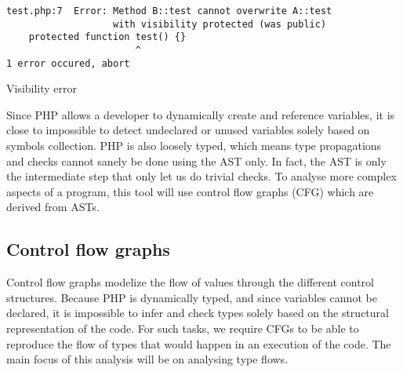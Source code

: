 \documentclass[a4paper]{article}
\begin{document}
\begin{listing}
  \begin{verbatim}
test.php:7  Error: Method B::test cannot overwrite A::test 
                   with visibility protected (was public)
    protected function test() {}
                       ^
1 error occured, abort
  \end{verbatim}
  \caption{Visibility error}
\end{listing}

Since PHP allows a developer to dynamically create and reference variables, it
is close to impossible to detect undeclared or unused variables solely based on
symbols collection. PHP is also loosely typed, which means type propagations
and checks cannot sanely be done using the AST only. In fact, the AST is only the
intermediate step that only let us do trivial checks. To analyse more complex
aspects of a program, this tool will use control flow graphs (CFG) which are
derived from ASTs.

\subsection{Control flow graphs}
Control flow graphs modelize the flow of values through the different control
structures. Because PHP is dynamically typed, and since variables cannot be
declared, it is impossible to infer and check types solely based on the
structural representation of the code. For such tasks, we require CFGs to
be able to reproduce the flow of types that would happen in an execution
of the code. The main focus of this analysis will be on analysing type flows.


\end{document}
